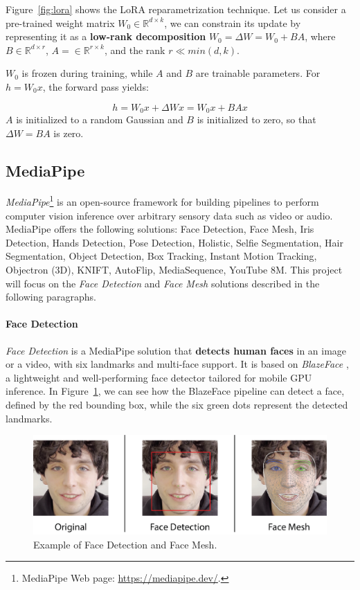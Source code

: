 \documentclass[preprint]{elsarticle}
\begin{document}
Figure~\ref{fig:lora} shows the LoRA reparametrization technique. Let us consider a  pre-trained weight matrix $W_0 \in \mathbb{R}^{d\times k}$, we can constrain its update by representing it as a \textbf{low-rank decomposition} $W_0 = \Delta W=W_0+BA$, where $B \in \mathbb{R}^{d \times r}$, $A= \in \mathbb{R}^{r \times k}$, and the rank $r \ll min(d,k)$.

$W_0$ is frozen during training, while $A$ and $B$ are trainable parameters.
For $h = W_0x$, the forward pass yields:

\begin{equation}
	h = W_0x + \Delta Wx = W_0x + BAx
\end{equation}
$A$ is initialized to a random Gaussian and $B$ is initialized to zero, so that
$\Delta W = BA$ is zero.



\subsection{MediaPipe}\label{sect:mediapipe}

\emph{MediaPipe}\footnote{MediaPipe Web page: \url{https://mediapipe.dev/}.}  is an open-source framework for building pipelines to perform computer vision  inference over arbitrary sensory data such as video or audio. MediaPipe offers the following solutions:
Face Detection, Face Mesh,  Iris Detection, Hands Detection, Pose Detection, Holistic, Selfie Segmentation, Hair Segmentation, Object Detection, Box Tracking, Instant Motion Tracking, Objectron (3D), KNIFT, AutoFlip, MediaSequence, YouTube 8M. This project will focus on the \emph{Face Detection} and \emph{Face Mesh} solutions described in the following paragraphs.

\paragraph{Face Detection}


\emph{Face Detection} is a MediaPipe solution that \textbf{detects human faces} in an image or a video,
with six landmarks and multi-face support.
It is based on \emph{BlazeFace} \cite{bazarevsky2019blazeface}, a lightweight and well-performing 
face detector tailored for mobile GPU inference.
In Figure~\ref{fig:MediapipeDemo}, we can see how the BlazeFace pipeline can detect a face, defined by the red bounding box, while the six green dots represent the detected landmarks.

\begin{figure}[t]
	\centering
	\includegraphics[scale=0.65, keepaspectratio]{img/background_img/MediapipeDemo.png}
	\caption{Example of Face Detection and Face Mesh.}\label{fig:MediapipeDemo}
\end{figure}
\end{document}
